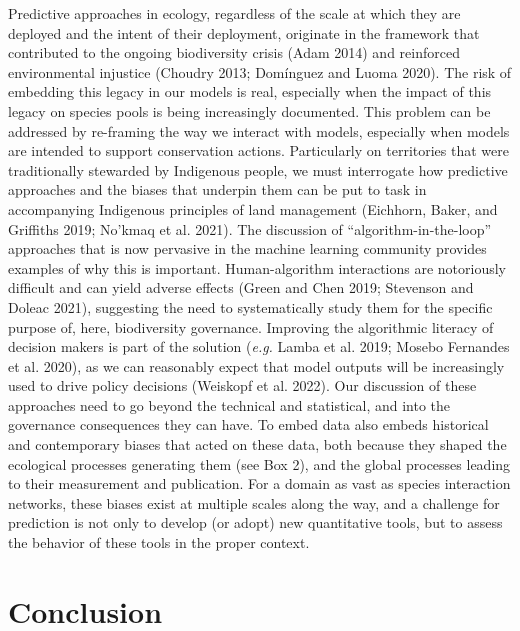 \documentclass[
  letterpaper,
  DIV=11,
  numbers=noendperiod]{scrartcl}
\begin{document}
Predictive approaches in ecology, regardless of the scale at which they
are deployed and the intent of their deployment, originate in the
framework that contributed to the ongoing biodiversity crisis (Adam
2014) and reinforced environmental injustice (Choudry 2013; Domínguez
and Luoma 2020). The risk of embedding this legacy in our models is
real, especially when the impact of this legacy on species pools is
being increasingly documented. This problem can be addressed by
re-framing the way we interact with models, especially when models are
intended to support conservation actions. Particularly on territories
that were traditionally stewarded by Indigenous people, we must
interrogate how predictive approaches and the biases that underpin them
can be put to task in accompanying Indigenous principles of land
management (Eichhorn, Baker, and Griffiths 2019; No'kmaq et al. 2021).
The discussion of ``algorithm-in-the-loop'' approaches that is now
pervasive in the machine learning community provides examples of why
this is important. Human-algorithm interactions are notoriously
difficult and can yield adverse effects (Green and Chen 2019; Stevenson
and Doleac 2021), suggesting the need to systematically study them for
the specific purpose of, here, biodiversity governance. Improving the
algorithmic literacy of decision makers is part of the solution
(\emph{e.g.} Lamba et al. 2019; Mosebo Fernandes et al. 2020), as we can
reasonably expect that model outputs will be increasingly used to drive
policy decisions (Weiskopf et al. 2022). Our discussion of these
approaches need to go beyond the technical and statistical, and into the
governance consequences they can have. To embed data also embeds
historical and contemporary biases that acted on these data, both
because they shaped the ecological processes generating them (see Box
2), and the global processes leading to their measurement and
publication. For a domain as vast as species interaction networks, these
biases exist at multiple scales along the way, and a challenge for
prediction is not only to develop (or adopt) new quantitative tools, but
to assess the behavior of these tools in the proper context.

\hypertarget{conclusion}{%
\section{Conclusion}\label{conclusion}}
\end{document}
